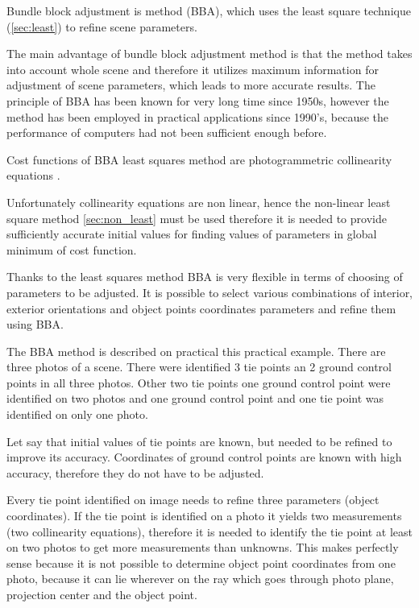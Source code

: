 \documentclass[a4paper,12pt]{article}
\begin{document}
Bundle block adjustment is method (BBA), which uses the least square technique (\ref{sec:least}) to refine scene parameters. 

The main advantage of bundle block adjustment method is that the method takes into account whole scene and therefore it utilizes 
maximum information for adjustment of scene parameters, which leads to more accurate results.
The principle of BBA has been known for very long time since 1950s,
however the method has been employed in practical applications since 1990's, because the performance of computers had not been 
sufficient enough before. 

Cost functions of BBA least squares method are photogrammetric collinearity equations \label{eq:col_eqs}.

Unfortunately collinearity equations are non linear, hence the non-linear least square method \ref{sec:non_least} must be used therefore 
it is needed to provide sufficiently accurate initial values for finding values of parameters in global minimum of cost function.

Thanks to the least squares method BBA is very flexible in terms of choosing of parameters to be adjusted. 
It is possible to select various combinations of interior, exterior orientations and object points coordinates parameters 
and refine them using BBA. 


The BBA method is described on practical this practical example.
There are three photos of a scene.
There were identified 3 tie points an 2 ground control points in all three photos.
Other two tie points one ground control point were identified on two photos and one ground control point and one tie point was identified 
on only one photo. 

Let say that initial values of tie points are known, but needed to be refined to improve its accuracy.
Coordinates of ground control points are known with high accuracy, therefore they do not have to be adjusted. 

Every tie point identified on image needs to refine three parameters (object coordinates). 
If the tie point is identified on a photo it yields two measurements (two collinearity equations), 
therefore it is needed to identify the tie point at least on two photos to get more measurements 
than unknowns. This makes perfectly sense because it is not possible to determine object point coordinates from one photo,
because it can lie wherever on the ray  which goes through photo plane, projection center and the object point.
\end{document}
